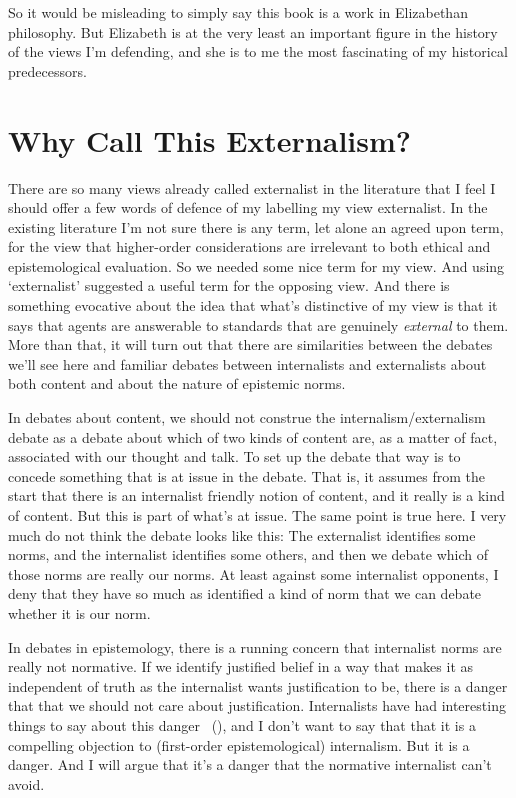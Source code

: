 \documentclass[
  10pt,
  letterpaper,
  twoside]{scrbook}
\begin{document}
So it would be misleading to simply say this book is a work in
Elizabethan philosophy. But Elizabeth is at the very least an important
figure in the history of the views I'm defending, and she is to me the
most fascinating of my historical predecessors.

\section{Why Call This Externalism?}\label{whycallthisexternalism}

There are so many views already called externalist in the literature
that I feel I should offer a few words of defence of my labelling my
view externalist. In the existing literature I'm not sure there is any
term, let alone an agreed upon term, for the view that higher-order
considerations are irrelevant to both ethical and epistemological
evaluation. So we needed some nice term for my view. And using
`externalist' suggested a useful term for the opposing view. And there
is something evocative about the idea that what's distinctive of my view
is that it says that agents are answerable to standards that are
genuinely \emph{external} to them. More than that, it will turn out that
there are similarities between the debates we'll see here and familiar
debates between internalists and externalists about both content and
about the nature of epistemic norms.

In debates about content, we should not construe the
internalism/externalism debate as a debate about which of two kinds of
content are, as a matter of fact, associated with our thought and talk.
To set up the debate that way is to concede something that is at issue
in the debate. That is, it assumes from the start that there is an
internalist friendly notion of content, and it really is a kind of
content. But this is part of what's at issue. The same point is true
here. I very much do not think the debate looks like this: The
externalist identifies some norms, and the internalist identifies some
others, and then we debate which of those norms are really our norms. At
least against some internalist opponents, I deny that they have so much
as identified a kind of norm that we can debate whether it is our norm.

In debates in epistemology, there is a running concern that internalist
norms are really not normative. If we identify justified belief in a way
that makes it as independent of truth as the internalist wants
justification to be, there is a danger that that we should not care
about justification. Internalists have had interesting things to say
about this danger ~(), and I don't
want to say that that it is a compelling objection to (first-order
epistemological) internalism. But it is a danger. And I will argue that
it's a danger that the normative internalist can't avoid.
\end{document}
